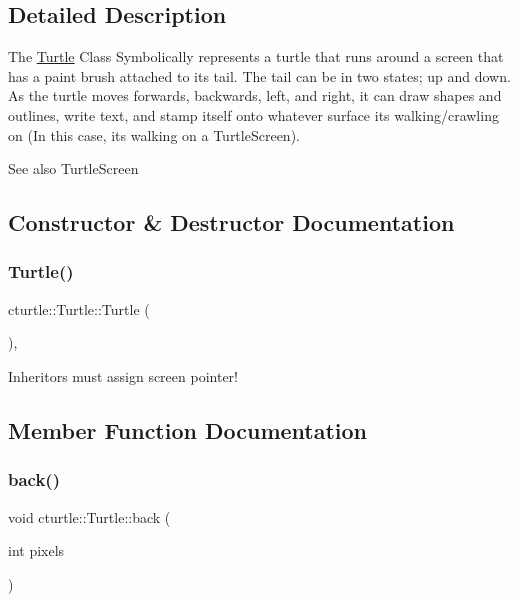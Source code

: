 \subsection{Detailed Description}
The \hyperlink{classcturtle_1_1Turtle}{Turtle} Class Symbolically represents a turtle that runs around a screen that has a paint brush attached to its tail. The tail can be in two states; up and down. As the turtle moves forwards, backwards, left, and right, it can draw shapes and outlines, write text, and stamp itself onto whatever surface it\textquotesingle{}s walking/crawling on (In this case, it\textquotesingle{}s walking on a Turtle\+Screen).

\begin{DoxySeeAlso}{See also}
Turtle\+Screen 
\end{DoxySeeAlso}


\subsection{Constructor \& Destructor Documentation}
\mbox{\label{classcturtle_1_1Turtle_a09d00aef49f669e24cab5574f184e07a}} 
\subsubsection{\texorpdfstring{Turtle()}{Turtle()}}
{\footnotesize\ttfamily cturtle\+::\+Turtle\+::\+Turtle (\begin{DoxyParamCaption}{ }\end{DoxyParamCaption})\hspace{0.3cm}{\ttfamily [inline]}, {\ttfamily [protected]}}

Inheritors must assign screen pointer! 

\subsection{Member Function Documentation}
\mbox{\label{classcturtle_1_1Turtle_a3df431a36f6b1efa56c6b885ae22fde9}} 
\subsubsection{\texorpdfstring{back()}{back()}}
{\footnotesize\ttfamily void cturtle\+::\+Turtle\+::back (\begin{DoxyParamCaption}\item[{int}]{pixels }\end{DoxyParamCaption})\hspace{0.3cm}{\ttfamily [inline]}}



